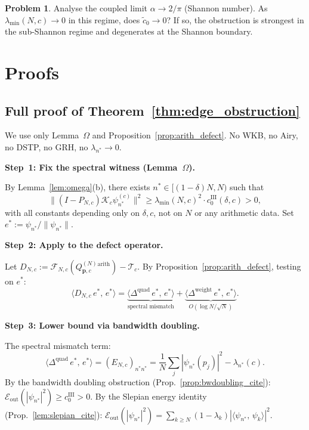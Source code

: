 \documentclass[12pt,a4paper]{amsart}
\theoremstyle{definition}
\newtheorem{problem}{Problem}[section]
\newcommand{\Kop}{\mathcal{K}_c}
\newcommand{\QM}{Q^{(N)}_{\mathbf{p},c}}
\newcommand{\ip}[2]{\langle #1,\, #2\rangle}
\newcommand{\Fcal}{\mathcal{F}_{N,c}}
\newcommand{\Tcal}{\mathcal{T}_c}
\newcommand{\Eout}{\mathcal{E}_{\mathrm{out}}}
\newcommand{\PN}{P_{N,c}}
\newcommand{\lmin}{\lambda_{\min}(N,c)}
\begin{document}
\begin{problem}\label{prob:coupled_limit}
Analyse the coupled limit $\alpha\to 2/\pi$ (Shannon number).
As $\lmin\to 0$ in this regime, does $\tilde c_0\to 0$?
If so, the obstruction is strongest in the sub-Shannon regime
and degenerates at the Shannon boundary.
\end{problem}

\section{Proofs}\label{sec:proofs}

\subsection{Full proof of Theorem~\ref{thm:edge_obstruction}}
\label{sec:proof_thmB}

We use only Lemma~$\Omega$ and Proposition~\ref{prop:arith_defect}.
No WKB, no Airy, no DSTP, no GRH, no $\lambda_{n^*}\to 0$.

\medskip
\noindent\textbf{Step~1: Fix the spectral witness (Lemma~$\Omega$).}

By Lemma~\ref{lem:omega}(b), there exists
$n^* \in [(1-\delta)N, N)$ such that
\begin{equation}\label{eq:witness_bound}
  \|(I-\PN)\Kop\psi_{n^*}^{(c)}\|^2
  \ge \lmin^2 \cdot c_0^{\mathrm{III}}(\delta,c) > 0,
\end{equation}
with all constants depending only on $\delta, c$, not on $N$ or
any arithmetic data. Set $e^* := \psi_{n^*}/\|\psi_{n^*}\|$.

\medskip
\noindent\textbf{Step~2: Apply to the defect operator.}

Let $D_{N,c} := \Fcal(\QM^{\mathrm{arith}}) - \Tcal$.
By Proposition~\ref{prop:arith_defect}, testing on $e^*$:
\[
  \ip{D_{N,c}\,e^*}{e^*}
  = \underbrace{\ip{\Delta^{\mathrm{quad}}\,e^*}{e^*}}_{\text{spectral mismatch}}
  + \underbrace{\ip{\Delta^{\mathrm{weight}}\,e^*}{e^*}}_{O(\log N/\sqrt{N})}.
\]

\medskip
\noindent\textbf{Step~3: Lower bound via bandwidth doubling.}

The spectral mismatch term:
\[
  \ip{\Delta^{\mathrm{quad}}\,e^*}{e^*}
  = (E_{N,c})_{n^*n^*}
  = \frac{1}{N}\sum_j|\psi_{n^*}(p_j)|^2 - \lambda_{n^*}(c).
\]
By the bandwidth doubling obstruction
(Prop.~\ref{prop:bwdoubling_cite}):
$\Eout(|\psi_{n^*}|^2) \ge c_0^{\mathrm{III}} > 0$.
By the Slepian energy identity (Prop.~\ref{lem:slepian_cite}):
$\Eout(|\psi_{n^*}|^2) = \sum_{k\ge N}(1-\lambda_k)|\ip{\psi_{n^*}}{\psi_k}|^2$.
\end{document}
